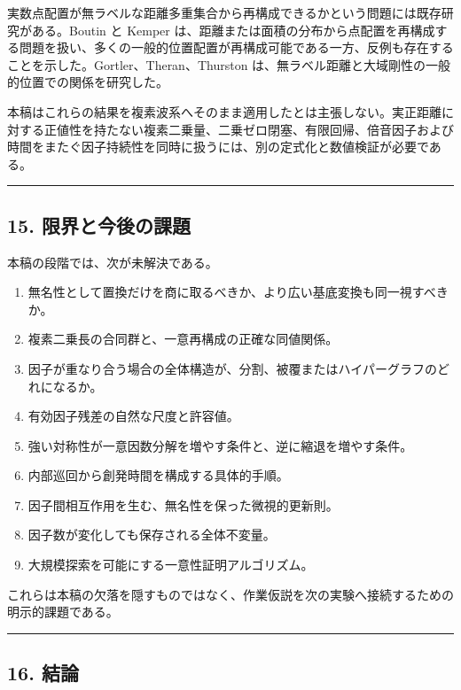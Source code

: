\documentclass[
  a4paper,
]{ltjsarticle}
\providecommand{\tightlist}{%
  \setlength{\itemsep}{0pt}\setlength{\parskip}{0pt}}
\begin{document}
実数点配置が無ラベルな距離多重集合から再構成できるかという問題には既存研究がある。Boutin
と Kemper
は、距離または面積の分布から点配置を再構成する問題を扱い、多くの一般的位置配置が再構成可能である一方、反例も存在することを示した。Gortler、Theran、Thurston
は、無ラベル距離と大域剛性の一般的位置での関係を研究した。

本稿はこれらの結果を複素波系へそのまま適用したとは主張しない。実正距離に対する正値性を持たない複素二乗量、二乗ゼロ閉塞、有限回帰、倍音因子および時間をまたぐ因子持続性を同時に扱うには、別の定式化と数値検証が必要である。

\begin{center}\rule{0.5\linewidth}{0.5pt}\end{center}

\subsection{15.
限界と今後の課題}\label{ux9650ux754cux3068ux4ecaux5f8cux306eux8ab2ux984c}

本稿の段階では、次が未解決である。

\begin{enumerate}
\def\labelenumi{\arabic{enumi}.}
\tightlist
\item
  無名性として置換だけを商に取るべきか、より広い基底変換も同一視すべきか。
\item
  複素二乗長の合同群と、一意再構成の正確な同値関係。
\item
  因子が重なり合う場合の全体構造が、分割、被覆またはハイパーグラフのどれになるか。
\item
  有効因子残差の自然な尺度と許容値。
\item
  強い対称性が一意因数分解を増やす条件と、逆に縮退を増やす条件。
\item
  内部巡回から創発時間を構成する具体的手順。
\item
  因子間相互作用を生む、無名性を保った微視的更新則。
\item
  因子数が変化しても保存される全体不変量。
\item
  大規模探索を可能にする一意性証明アルゴリズム。
\end{enumerate}

これらは本稿の欠落を隠すものではなく、作業仮説を次の実験へ接続するための明示的課題である。

\begin{center}\rule{0.5\linewidth}{0.5pt}\end{center}

\subsection{16. 結論}\label{ux7d50ux8ad6}
\end{document}
